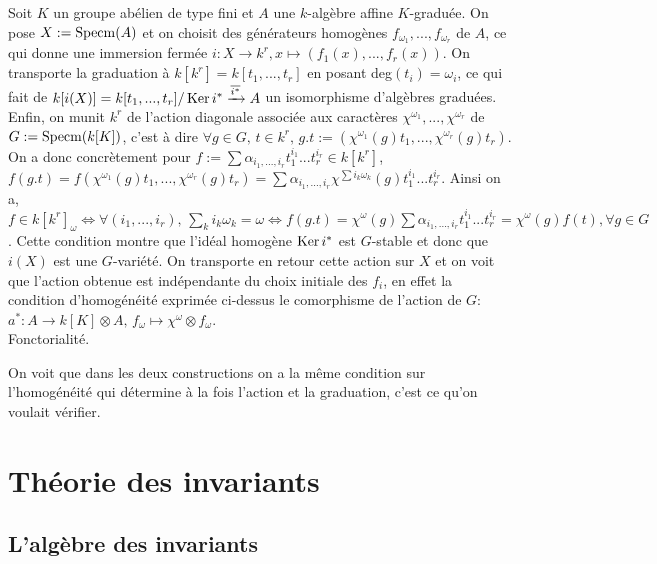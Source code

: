 \begin{cons}
Soit $K$ un groupe abélien de type fini et $A$ une $k$-algèbre affine $K$-graduée. On pose $X:=\operatorname{Specm}(A)$ et on choisit des générateurs homogènes $f_{\omega_1},...,f_{\omega_r}$ de $A$, ce qui donne une immersion fermée $i:X\rightarrow k^r, x\mapsto (f_1(x),...,f_r(x))$. On transporte la graduation à $k[k^r]=k[t_1,...,t_r]$ en posant deg$(t_i)=\omega _i$, ce qui fait de $k[i(X)]=k[t_1,...,t_r]/\operatorname{Ker} i^*\xrightarrow{\overline{i^*}}A$ un isomorphisme d'algèbres graduées. Enfin, on munit $k^r$ de l'action diagonale associée aux caractères $\chi^{\omega_1},...,\chi^{\omega_r}$ de $G:=\operatorname{Specm}(k[K])$, c'est à dire $\forall g\in G,\, t\in k^r,\, g.t := (\chi^{\omega_1}(g)t_1,...,\chi^{\omega_r}(g)t_r)$. On a donc concrètement pour $f:=\sum\alpha_{i_1,...,i_r}t_1^{i_1}...t_r^{i_r}\in k[k^r]$, $f(g.t)=f(\chi^{\omega_1}(g)t_1,...,\chi^{\omega_r}(g)t_r)=\sum\alpha_{i_1,...,i_r}\chi^{\sum i_k\omega_k}(g)t_1^{i_1}...t_r^{i_r}$. Ainsi on a, $f\in k[k^r]_{\omega}\iff \forall (i_1,...,i_r),\, \sum_k i_k\omega_k=\omega \iff f(g.t)=\chi^{\omega}(g)\sum\alpha_{i_1,...,i_r}t_1^{i_1}...t_r^{i_r}=\chi^{\omega}(g)f(t), \forall g\in G$. Cette condition montre que l'idéal homogène $\operatorname{Ker} i^*$ est $G$-stable et donc que $i(X)$ est une $G$-variété. On transporte en retour cette action sur $X$ et on voit que l'action obtenue est indépendante du choix initiale des $f_i$, en effet la condition d'homogénéité exprimée ci-dessus le comorphisme de l'action de $G$: $a^*:A\rightarrow k[K]\otimes A,\, f_{\omega}\mapsto \chi^{\omega}\otimes f_{\omega}$.\\
Fonctorialité.
\end{cons}

On voit que dans les deux constructions on a la même condition sur l'homogénéité qui détermine à la fois l'action et la graduation, c'est ce qu'on voulait vérifier.



\section{Théorie des invariants}
\subsection{L'algèbre des invariants}

